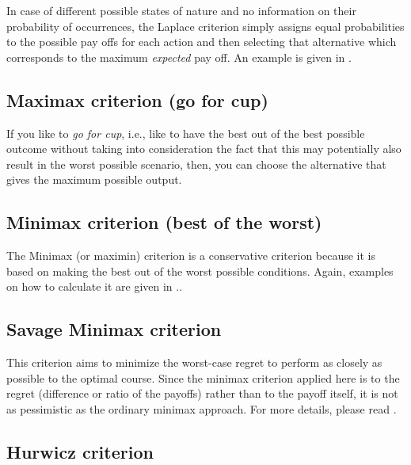 \documentclass[
  12pt,
  oneside]{book}
\theoremstyle{definition}
\theoremstyle{definition}
\theoremstyle{definition}
\theoremstyle{definition}
\theoremstyle{remark}
\begin{document}
In case of different possible states of nature and no information on their probability of occurrences, the Laplace criterion simply assigns equal probabilities to the possible pay offs for each action and then selecting that alternative which corresponds to the maximum \emph{expected} pay off. An example is given in \citet{Finne1998three}.

\hypertarget{maximax-criterion-go-for-cup}{%
\subsection*{Maximax criterion (go for cup)}\label{maximax-criterion-go-for-cup}}

If you like to \emph{go for cup}, i.e., like to have the best out of the best possible outcome without taking into consideration the fact that this may potentially also result in the worst possible scenario, then, you can choose the alternative that gives the maximum possible output.

\hypertarget{minimax-criterion-best-of-the-worst}{%
\subsection*{Minimax criterion (best of the worst)}\label{minimax-criterion-best-of-the-worst}}

The Minimax (or maximin) criterion is a conservative criterion because it is based on making the best out of the worst possible conditions. Again, examples on how to calculate it are given in \citet{Finne1998three}..

\hypertarget{savage-minimax-criterion}{%
\subsection*{Savage Minimax criterion}\label{savage-minimax-criterion}}

This criterion aims to minimize the worst-case regret to perform as closely as possible to the optimal course. Since the minimax criterion applied here is to the regret (difference or ratio of the payoffs) rather than to the payoff itself, it is not as pessimistic as the ordinary minimax approach. For more details, please read \citet{Finne1998three}.

\hypertarget{hurwicz-criterion}{%
\subsection*{Hurwicz criterion}\label{hurwicz-criterion}}
\end{document}
